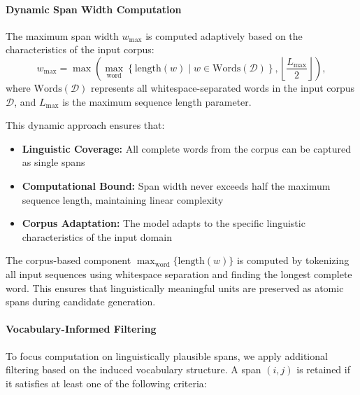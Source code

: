 \paragraph{Dynamic Span Width Computation}

The maximum span width \(w_{\max}\) is computed adaptively based on the characteristics of the input corpus:
\begin{equation}
w_{\max} = \max\left(\max_{\text{word}} \left\{\text{length}(w) \mid w \in \text{Words}(\mathcal{D})\right\}, \left\lfloor \frac{L_{\max}}{2} \right\rfloor\right),
\label{eq:dynamic-w-max}
\end{equation}
where \(\text{Words}(\mathcal{D})\) represents all whitespace-separated words in the input corpus \(\mathcal{D}\), and \(L_{\max}\) is the maximum sequence length parameter.

This dynamic approach ensures that:
\begin{itemize}
	\item \textbf{Linguistic Coverage:} All complete words from the corpus can be captured as single spans
	\item \textbf{Computational Bound:} Span width never exceeds half the maximum sequence length, maintaining linear complexity
	\item \textbf{Corpus Adaptation:} The model adapts to the specific linguistic characteristics of the input domain
\end{itemize}

The corpus-based component \(\max_{\text{word}} \{\text{length}(w)\}\) is computed by tokenizing all input sequences using whitespace separation and finding the longest complete word. This ensures that linguistically meaningful units are preserved as atomic spans during candidate generation.

\paragraph{Vocabulary-Informed Filtering}

To focus computation on linguistically plausible spans, we apply additional filtering based on the induced vocabulary structure. A span \((i,j)\) is retained if it satisfies at least one of the following criteria:

